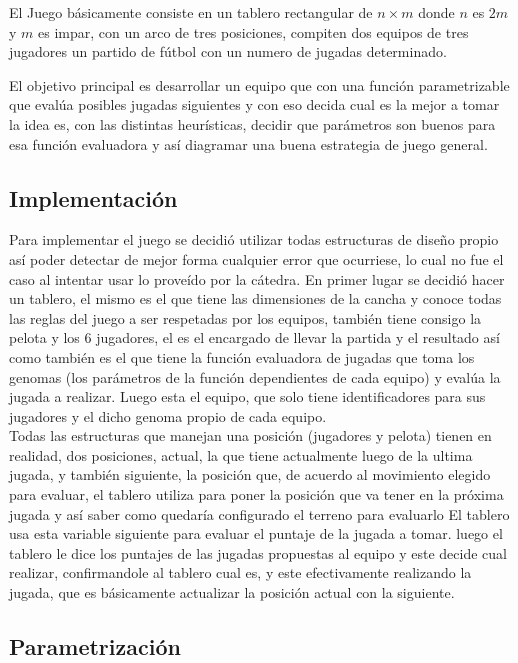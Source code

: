 
El Juego básicamente consiste en un tablero rectangular de $n \times m$ donde
$n$ es $2m$ y $m$ es impar, con un arco de tres posiciones, compiten dos equipos
de tres jugadores un partido de fútbol con un numero de jugadas determinado.


El objetivo principal es desarrollar un equipo que con una función parametrizable
que evalúa posibles jugadas siguientes y con eso decida cual es la mejor a tomar
la idea es, con las distintas heurísticas, decidir que parámetros son buenos para esa
función evaluadora y así diagramar una buena estrategia de juego general.\\

\subsection{Implementación}


Para implementar el juego se decidió utilizar todas estructuras de diseño propio así poder
detectar de mejor forma cualquier error que ocurriese, lo cual no fue el caso al intentar
usar lo proveído por la cátedra.
En primer lugar se decidió hacer un tablero, el mismo es el que tiene las dimensiones de la cancha y
conoce todas las reglas del juego a ser respetadas por los equipos, también tiene consigo la pelota y los
6 jugadores, el es el encargado de llevar la partida y el resultado así como también es el que tiene la
función evaluadora de jugadas que toma los genomas (los parámetros de la función dependientes de cada equipo)
y evalúa la jugada a realizar.
Luego esta el equipo, que solo tiene identificadores para sus jugadores y el dicho genoma propio de cada equipo.\\


Todas las estructuras que manejan una posición (jugadores y pelota) tienen en realidad, dos posiciones, actual, la que
tiene actualmente luego de la ultima jugada, y también siguiente, la posición que, de acuerdo al
movimiento elegido para evaluar, el tablero utiliza para poner la posición que va tener en la próxima jugada y así
saber como quedaría configurado el terreno para evaluarlo
El tablero usa esta variable siguiente para evaluar el puntaje de la jugada a tomar.
luego el tablero le dice los puntajes de las jugadas propuestas al equipo y este decide cual realizar, confirmandole
al tablero cual es, y este efectivamente realizando la jugada, que es básicamente actualizar la posición actual
con la siguiente.\\

\subsection{Parametrización}

